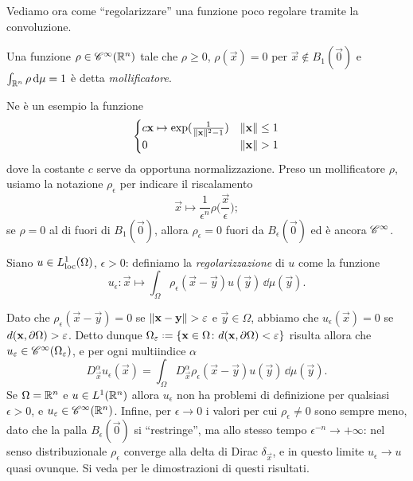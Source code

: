 Vediamo ora come ``regolarizzare'' una funzione poco regolare tramite la convoluzione.
\begin{definizione} \label{d:mollificatore}
    Una funzione $\rho\in\cont[\infty]{\R^n}$ tale che $\rho\ge 0$, $\rho(\vec x)=0$ per $\vec x\notin B_1(\vec 0)$ e $\int_{\R^n}\rho\,\dd\mu=1$ è detta \emph{mollificatore}.
\end{definizione}
Ne è un esempio la funzione
\begin{equation*}
    \begin{cases}
        c\vec x\mapsto\exp(\frac1{\norm{\vec x}^2-1}) & \norm{\vec x}\le 1 \\
        0                                             & \norm{\vec x}>1
    \end{cases}
\end{equation*}
dove la costante $c$ serve da opportuna normalizzazione.
Preso un mollificatore $\rho$, usiamo la notazione $\rho_\epsilon$ per indicare il riscalamento
\begin{equation}
    \vec x\mapsto\frac1{\epsilon^n}\rho\biggl(\frac{\vec x}{\epsilon}\biggr);
\end{equation}
se $\rho=0$ al di fuori di $B_1(\vec 0)$, allora $\rho_\epsilon=0$ fuori da $B_\epsilon(\vec 0)$ ed è ancora $\cclass[\infty]$.
\begin{definizione} \label{d:regolarizzazione}
    Siano $u\in\locleb[1]{\Omega}$, $\epsilon>0$: definiamo la \emph{regolarizzazione} di $u$ come la funzione
    \begin{equation}
        u_\epsilon\colon\vec x\mapsto\int_\Omega\rho_\epsilon(\vec x-\vec y)u(\vec y)\,\dd\mu(\vec y).
        \label{eq:regolarizzazione}
    \end{equation}
\end{definizione}
Dato che $\rho_\epsilon(\vec x-\vec y)=0$ se $\norm{\vec x-\vec y}>\epsilon$ e $\vec y\in\Omega$, abbiamo che $u_\epsilon(\vec x)=0$ se $d(\vec x,\boundary\Omega)>\epsilon$.
Detto dunque $\Omega_\epsilon\defeq\{\vec x\in\Omega\colon d(\vec x,\boundary\Omega)<\epsilon\}$ risulta allora che $u_\epsilon\in\cont[\infty]{\Omega_\epsilon}$, e per ogni multiindice $\alpha$
\begin{equation}
    D_{\vec x}^\alpha u_\epsilon(\vec x)=\int_\Omega D_{\vec x}^\alpha\rho_\epsilon(\vec x-\vec y)u(\vec y)\,\dd\mu(\vec y).
\end{equation}
Se $\Omega=\R^n$ e $u\in\leb[1]{\R^n}$ allora $u_\epsilon$ non ha problemi di definizione per qualsiasi $\epsilon>0$, e $u_\epsilon\in\cont[\infty]{\R^n}$.
Infine, per $\epsilon\to 0$ i valori per cui $\rho_\epsilon\ne 0$ sono sempre meno, dato che la palla $B_\epsilon(\vec 0)$ si ``restringe'', ma allo stesso tempo $\epsilon^{-n}\to+\infty$: nel senso distribuzionale $\rho_\epsilon$ converge alla delta di Dirac $\delta_{\vec x}$, e in questo limite $u_\epsilon\to u$ quasi ovunque.
Si veda \cite[p.~630]{evans} per le dimostrazioni di questi risultati.

